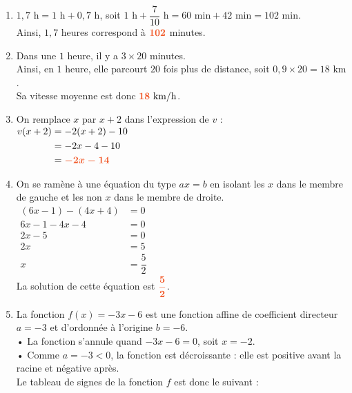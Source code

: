\documentclass[a4paper,11pt]{article}
\begin{document}
\begin{seance}{} %
\begin{enumerate}
\item  $1{,}7\text{ h} =1 \text{ h} + 0{,}7 \text{ h}$, soit $1\text{ h} + \dfrac{7}{10} \text{ h} = 60 \text{ min} + 42\text{ min} = 102 \text{ min}$.\\
          Ainsi, $1{,}7$ heures correspond à ${\color[HTML]{f15929}\boldsymbol{102}}$ {\color[HTML]{f15929}minutes}.


\item Dans une $1$ heure, il y a $3\times 20$ minutes.\\
    Ainsi, en $1$ heure, elle parcourt $20$ fois plus de distance, soit $0{,}9\times 20=18\text{ km}$.\\
    Sa vitesse moyenne est donc ${\color[HTML]{f15929}\boldsymbol{18}}\text{ km/h}$.

\item 
 On remplace $x$ par $x+2$ dans l'expression de $v$ :\\
         $\begin{aligned}
        v(x+2)&=-2(x+2)-10 \\
        &=-2x-4-10\\
        &={\color[HTML]{f15929}\boldsymbol{-2x-14}}
        \end{aligned}$


\item  On se ramène à une équation du type $ax=b$ en isolant les  \og{} $x$ \fg{} dans le membre de gauche et les \og{} non $x$ \fg{} dans le membre de droite.\\
    $\begin{aligned}
    (6x-1)-(4x+4)&=0\\
   6x-1-4x-4&=0\\
 2x-5&=0\\
 2x&=5\\
x&= \dfrac{5}{2}
\end{aligned}$\\
    
   La solution de cette équation est  ${\color[HTML]{f15929}\boldsymbol{\dfrac{5}{2}}}$.


\item  La fonction $f(x) = -3x-6$ est une fonction affine de coefficient directeur $a = -3$ et d'ordonnée à l'origine $b = -6$.\\
    • La fonction s'annule quand $-3x-6 = 0$, soit $x = -2$.\\
    • Comme $a = -3 < 0$, la fonction est décroissante : elle est positive avant la racine et négative après.\\
    Le tableau de signes de la fonction $f$ est donc le suivant :\\



\end{enumerate}
\end{seance}
\end{document}
